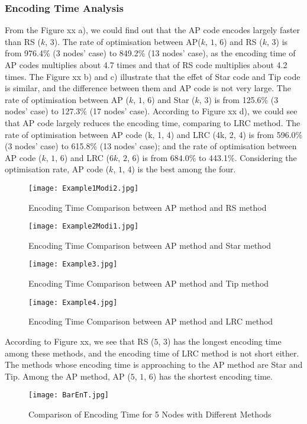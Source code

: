 \subsubsection{Encoding Time Analysis}
From the Figure xx a), we could find out that the AP code encodes largely faster than RS ($k$, $3$). The rate of optimisation between AP($k$, $1$, $6$) and RS ($k$, $3$) is from 976.4\% (3 nodes’ case) to 849.2\% (13 nodes’ case), as the encoding time of AP codes multiplies about 4.7 times and that of RS code multiplies about 4.2 times. The Figure xx b) and c) illustrate that the effet of Star code and Tip code is similar, and the difference between them and AP code is not very large. The rate of optimisation between AP ($k$, $1$, $6$) and Star ($k$, $3$) is from 125.6\% (3 nodes’ case) to 127.3\% (17 nodes’ case). According to Figure xx d), we could see that AP code largely reduces the encoding time, comparing to LRC method. The rate of optimisation between AP code (k, 1, 4) and LRC (4k, 2, 4) is from 596.0\% (3 nodes’ case) to 615.8\% (13 nodes’ case); and the rate of optimisation between AP code ($k$, $1$, $6$) and LRC ($6k$, $2$, $6$) is from 684.0\% to 443.1\%. Considering the optimisation rate, AP code ($k$, $1$, $4$) is the best among the four.\par
\begin{figure}[H]
\begin{minipage}{0.25\lineWidth}
\centering
\texttt{[image: Example1Modi2.jpg]}
\caption{Encoding Time Comparison between AP method and RS method}
\end{minipage}
\begin{minipage}{0.25\lineWidth}
\centering
\texttt{[image: Example2Modi1.jpg]}
\caption{Encoding Time Comparison between AP method and Star method}
\end{minipage}
\begin{minipage}{0.25\lineWidth}
\centering
\texttt{[image: Example3.jpg]}
\caption{Encoding Time Comparison between AP method and Tip method}
\end{minipage}
\begin{minipage}{0.25\lineWidth}
\centering
\texttt{[image: Example4.jpg]}
\caption{Encoding Time Comparison between AP method and LRC method}
\end{minipage}
\end{figure}\par

According to Figure xx, we see that RS ($5$, $3$) has the longest encoding time among these methods, and the encoding time of LRC method is not short either. The methods whose encoding time is approaching to the AP method are Star and Tip. Among the AP method, AP ($5$, $1$, $6$) has the shortest encoding time.\par
\begin{figure}[H]
\centering
\texttt{[image: BarEnT.jpg]}
\caption{Comparison of Encoding Time for 5 Nodes with Different Methods}
\end{figure}


